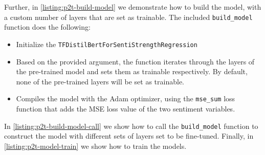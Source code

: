 Further, in \cref{listing:p2t-build-model} we demonstrate how to build the model, with a custom number of layers that are set as trainable. The included \texttt{build\_model} function does the following:
\begin{itemize}
    \item Initialize the \texttt{TFDistilBertForSentiStrengthRegression}
    \item Based on the provided argument, the function iterates through the layers of the pre-trained model and sets them as trainable respectively. By default, none of the pre-trained layers will be set as trainable.
    \item Compiles the model with the Adam optimizer, using the \texttt{mse\_sum} loss function that adds the MSE loss value of the two sentiment variables.
\end{itemize}
In \cref{listing:p2t-build-model-call} we show how to call the \texttt{build\_model} function to construct the model with different sets of layers set to be fine-tuned.
Finally, in \cref{listing:p2t-model-train} we show how to train the models.

